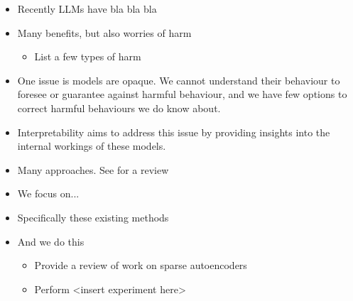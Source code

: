 \begin{itemize}
    \item Recently LLMs have bla bla bla
    \item Many benefits, but also worries of harm
    \begin{itemize}
        \item List a few types of harm
    \end{itemize}
    \item One issue is models are opaque. We cannot understand their behaviour to foresee or guarantee against harmful behaviour, and we have few options to correct harmful behaviours we do know about.
    \item Interpretability aims to address this issue by providing insights into the internal workings of these models.
    \item Many approaches. See \cite{bereska_mechanistic_2024} for a review
    \item We focus on...
    \item Specifically these existing methods
    \item And we do this
    \begin{itemize}
        \item Provide a review of work on sparse autoencoders
        \item Perform <insert experiment here>
    \end{itemize}
\end{itemize}
